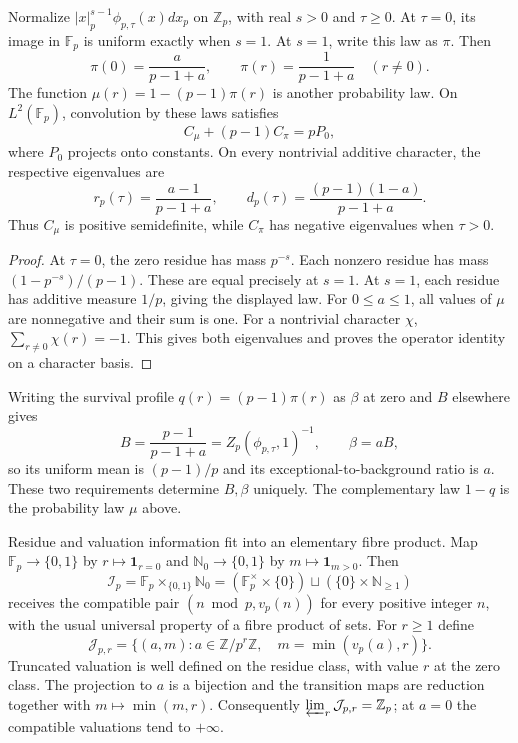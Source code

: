 \begin{proposition}
\label{syn-arith:residue-laws}
Normalize $|x|_p^{s-1}\phi_{p,\tau}(x)dx_p$ on $\mathbb Z_p$, with
real $s>0$ and $\tau\geq0$.  At $\tau=0$, its image in $\mathbb F_p$
is uniform exactly when $s=1$.  At $s=1$, write this law as $\pi$.
Then
\[
 \pi(0)=\frac a{p-1+a},\qquad
 \pi(r)=\frac1{p-1+a}\quad(r\ne0).
\]
The function $\mu(r)=1-(p-1)\pi(r)$ is another probability law.
On $L^2(\mathbb F_p)$, convolution by these laws satisfies
\[
 C_\mu+(p-1)C_\pi=pP_0,
\]
where $P_0$ projects onto constants.
On every nontrivial additive character, the respective eigenvalues are
\[
 r_p(\tau)=\frac{a-1}{p-1+a},\qquad
 d_p(\tau)=\frac{(p-1)(1-a)}{p-1+a}.
\]
Thus $C_\mu$ is positive semidefinite, while $C_\pi$ has negative eigenvalues
when $\tau>0$.
\end{proposition}
\begin{proof}
At $\tau=0$, the zero residue has mass $p^{-s}$.
Each nonzero residue has mass $(1-p^{-s})/(p-1)$.
These are equal precisely at $s=1$.
At $s=1$, each residue has additive measure $1/p$, giving the displayed law.
For $0\leq a\leq1$, all values of $\mu$ are nonnegative and their sum is one.
For a nontrivial character $\chi$, $\sum_{r\ne0}\chi(r)=-1$.
This gives both eigenvalues and proves the operator identity on a character basis.
\end{proof}

Writing the survival profile $q(r)=(p-1)\pi(r)$ as $\beta$ at zero and $B$
elsewhere gives
\[
 B=\frac{p-1}{p-1+a}=Z_p(\phi_{p,\tau},1)^{-1},\qquad
 \beta=aB,
\]
so its uniform mean is $(p-1)/p$ and its exceptional-to-background ratio is
$a$.  These two requirements determine $B,\beta$ uniquely.
The complementary law $1-q$ is the probability law $\mu$ above.

Residue and valuation information fit into an elementary fibre product.
Map $\mathbb F_p\to\{0,1\}$ by $r\mapsto\mathbf1_{r=0}$ and
$\mathbb N_0\to\{0,1\}$ by $m\mapsto\mathbf1_{m>0}$.
Then
\[
 \mathcal I_p=\mathbb F_p\times_{\{0,1\}}\mathbb N_0
 = (\mathbb F_p^\times\times\{0\})\sqcup(\{0\}\times\mathbb N_{\geq1})
\]
receives the compatible pair $(n\bmod p,v_p(n))$ for every positive integer
$n$, with the usual universal property of a fibre product of sets.
For $r\geq1$ define
\[
 \mathcal J_{p,r}=\{(a,m):a\in\mathbb Z/p^r\mathbb Z,\quad
                  m=\min(v_p(a),r)\}.
\]
Truncated valuation is well defined on the residue class, with value $r$
at the zero class.  The projection to $a$ is a bijection and the transition
maps are reduction together with $m\mapsto\min(m,r)$.
Consequently $\varprojlim_r\mathcal J_{p,r}=\mathbb Z_p$; at $a=0$ the
compatible valuations tend to $+\infty$.

